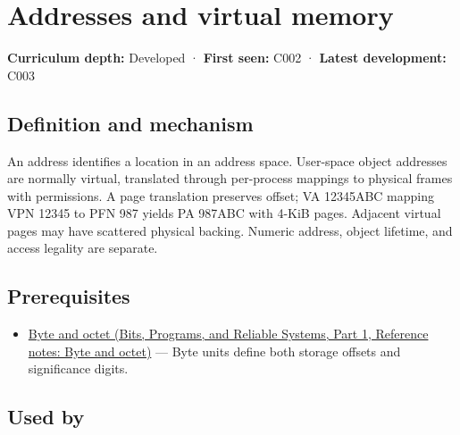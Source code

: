 \hypertarget{appendix-18ee4f913c3c}{}\label{referencestart:appendix-18ee4f913c3c}
\section{Addresses and virtual memory}\label{appendix-18ee4f913c3c-addresses-and-virtual-memory}

\hypertarget{appendix-18ee4f913c3c-addresses-and-virtual-memory}{}

\textbf{Curriculum depth:} Developed · \textbf{First seen:} C002 · \textbf{Latest development:} C003

\begin{allmightroledefinition}

\subsection{Definition and mechanism}\label{appendix-18ee4f913c3c-definition-and-mechanism}

\hypertarget{appendix-18ee4f913c3c-definition-and-mechanism}{}

An address identifies a location in an address space. User-space object addresses are normally virtual, translated through per-process mappings to physical frames with permissions. A page translation preserves offset; VA 12345ABC mapping VPN 12345 to PFN 987 yields PA 987ABC with 4-KiB pages. Adjacent virtual pages may have scattered physical backing. Numeric address, object lifetime, and access legality are separate.

\end{allmightroledefinition}

\subsection{Prerequisites}\label{appendix-18ee4f913c3c-prerequisites}

\hypertarget{appendix-18ee4f913c3c-prerequisites}{}

\begin{itemize}
\tightlist
\item
  \href{../01-Bits-Programs-and-Reliable-Systems-P01/main.pdf\#nameddest=appendix-5bee2df85484}{Byte and octet (Bits, Programs, and Reliable Systems, Part 1, Reference notes: Byte and octet)} --- Byte units define both storage offsets and significance digits.
\end{itemize}

\subsection{Used by}\label{appendix-18ee4f913c3c-used-by}


